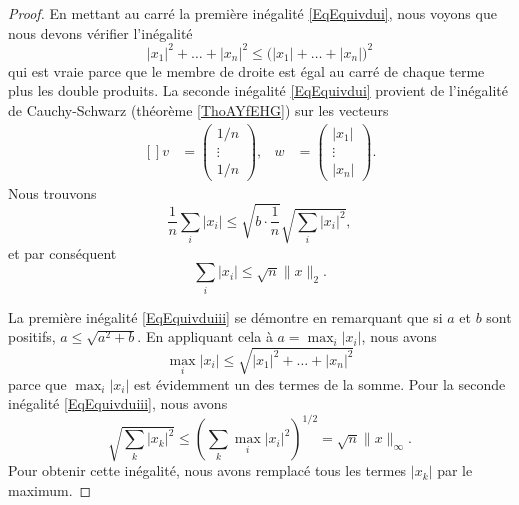 \begin{proof}
    En mettant au carré la première inégalité \eqref{EqEquivdui}, nous voyons que nous devons vérifier l'inégalité
    \begin{equation}
        | x_1 |^2+\ldots+| x_n |^2\leq\big( | x_1 |+\ldots+| x_n | \big)^2
    \end{equation}
    qui est vraie parce que le membre de droite est égal au carré de chaque terme plus les double produits. La seconde inégalité \eqref{EqEquivdui} provient de l'inégalité de Cauchy-Schwarz (théorème \ref{ThoAYfEHG}) sur les vecteurs
    \begin{equation}
        \begin{aligned}[]
            v&=\begin{pmatrix}
                1/n    \\ 
                \vdots    \\ 
                1/n    
            \end{pmatrix},
            &w&=\begin{pmatrix}
                | x_1 |    \\ 
                \vdots    \\ 
                | x_n |    
            \end{pmatrix}.
        \end{aligned}
    \end{equation}
    Nous trouvons 
    \begin{equation}
        \frac{1}{ n }\sum_i| x_i |\leq\sqrt{b\cdot\frac{1}{ n }}\sqrt{\sum_i| x_i |^2},
    \end{equation}
    et par conséquent
    \begin{equation}
        \sum_i| x_i |\leq\sqrt{n}\| x \|_2.
    \end{equation}
    
    La première inégalité \eqref{EqEquivduiii} se démontre en remarquant que si \( a\) et \( b\) sont positifs, \( a\leq\sqrt{a^2+b}\). En appliquant cela à \( a=\max_i| x_i |\), nous avons
    \begin{equation}
        \max_i| x_i |\leq\sqrt{ | x_1 |^2+\ldots+| x_n |^2  }
    \end{equation}
    parce que \( \max_i| x_i |\) est évidemment un des termes de la somme. Pour la seconde inégalité \eqref{EqEquivduiii}, nous avons
    \begin{equation}
        \sqrt{\sum_k| x_k |^2}\leq\left( \sum_k\max_i| x_i |^2 \right)^{1/2}=\sqrt{n}\| x \|_{\infty}.
    \end{equation}
    Pour obtenir cette inégalité, nous avons remplacé tous les termes \( | x_k |\) par le maximum.
\end{proof}

